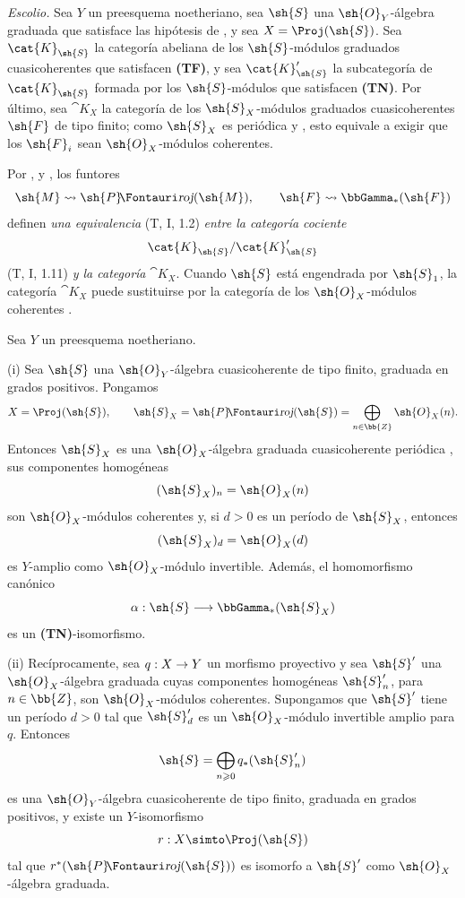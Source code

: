 \documentclass[oneside]{amsart}
\makeatletter
\renewcommand{\geq}{\geqslant}
\newcommand{\ega@arrow}[2]{\mathchoice{#1}{#2}{#2}{#2}}
\renewcommand{\to}{\ega@arrow{\longrightarrow}{\rightarrow}}
\newcommand*{\ega@sheafop}[3]{\sh{#1}#2\textup{\kern-2.2pt{\Fontauri\slshape #3}}}
\newcommand*{\shProj}{\ega@sheafop{P}{}{roj}}
\let\EGAOriginalLabel\label
\renewcommand{\label}[1]{\phantomsection\EGAOriginalLabel{#1}}
\makeatother
\begin{document}
\begin{env}[2.3.3]
\label{III.2.3.3}
\emph{Escolio.}
Sea $Y$ un preesquema noetheriano, sea $\sh{S}$ una $\sh{O}_Y$-álgebra graduada que satisface las hipótesis de , y sea $X=\Proj(\sh{S})$.
Sea $\cat{K}_{\sh{S}}$ la categoría abeliana de los $\sh{S}$-módulos graduados cuasicoherentes que satisfacen \textbf{(TF)}, y sea $\cat{K}'_{\sh{S}}$ la subcategoría de $\cat{K}_{\sh{S}}$ formada por los $\sh{S}$-módulos que satisfacen \textbf{(TN)}.
Por último, sea $\cat{K}_X$ la categoría de los $\sh{S}_X$-módulos graduados cuasicoherentes $\sh{F}$ de tipo finito; como $\sh{S}_X$ es periódica  y , esto equivale a exigir que los $\sh{F}_i$ sean $\sh{O}_X$-módulos coherentes.

Por ,  y , los funtores
\[
  \sh{M}\leadsto\shProj(\sh{M}),
  \qquad
  \sh{F}\leadsto\bbGamma_*(\sh{F})
\]
definen \emph{una equivalencia} (T, I, 1.2) \emph{entre la categoría cociente}
\[
  \cat{K}_{\sh{S}}/\cat{K}'_{\sh{S}}
\]
(T, I, 1.11) \emph{y la categoría} $\cat{K}_X$.
Cuando $\sh{S}$ está engendrada por $\sh{S}_1$, la categoría $\cat{K}_X$ puede sustituirse por la categoría de los $\sh{O}_X$-módulos coherentes .
\end{env}

\begin{proposition}[2.3.4]
\label{III.2.3.4}
Sea $Y$ un preesquema noetheriano.

(i) Sea $\sh{S}$ una $\sh{O}_Y$-álgebra cuasicoherente de tipo finito, graduada en grados positivos.
Pongamos
\[
  X=\Proj(\sh{S}),\qquad
  \sh{S}_X=\shProj(\sh{S})
  =\bigoplus_{n\in\bb{Z}}\sh{O}_X(n).
\]
Entonces $\sh{S}_X$ es una $\sh{O}_X$-álgebra graduada cuasicoherente periódica \textup{}, sus componentes homogéneas
\[
  (\sh{S}_X)_n=\sh{O}_X(n)
\]
son $\sh{O}_X$-módulos coherentes y, si $d>0$ es un período de $\sh{S}_X$, entonces
\[
  (\sh{S}_X)_d=\sh{O}_X(d)
\]
es $Y$-amplio como $\sh{O}_X$-módulo invertible.
Además, el homomorfismo canónico
\[
  \alpha:\sh{S}\longrightarrow\bbGamma_*(\sh{S}_X)
\]
es un \textup{\textbf{(TN)}}-isomorfismo.

(ii) Recíprocamente, sea $q:X\to Y$ un morfismo proyectivo y sea $\sh{S}'$ una $\sh{O}_X$-álgebra graduada cuyas componentes homogéneas $\sh{S}'_n$, para $n\in\bb{Z}$, son $\sh{O}_X$-módulos coherentes.
Supongamos que $\sh{S}'$ tiene un período $d>0$ tal que $\sh{S}'_d$ es un $\sh{O}_X$-módulo invertible amplio para $q$.
Entonces
\[
  \sh{S}=\bigoplus_{n\geq0}q_*(\sh{S}'_n)
\]
es una $\sh{O}_Y$-álgebra cuasicoherente de tipo finito, graduada en grados positivos, y existe un $Y$-isomorfismo
\[
  r:X\simto\Proj(\sh{S})
\]
tal que $r^*(\shProj(\sh{S}))$ es isomorfo a $\sh{S}'$ como $\sh{O}_X$-álgebra graduada.
\end{proposition}
\end{document}
